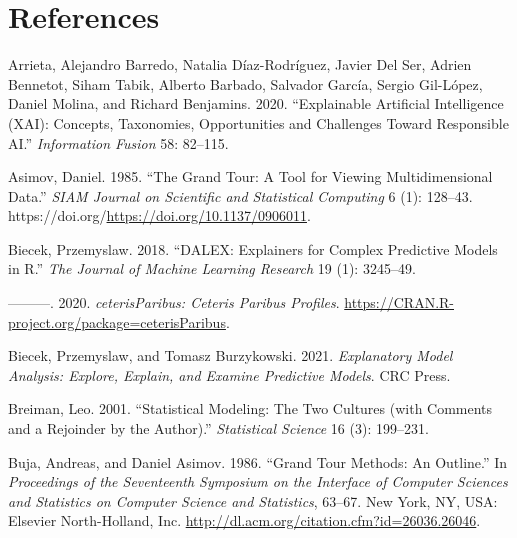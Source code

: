\documentclass[
]{article}
\newlength{\cslhangindent}
\newlength{\cslentryspacingunit} %
\newenvironment{CSLReferences}[2] %
 {%
  \setlength{\parindent}{0pt}
  \ifodd #1
  \let\oldpar\par
  \def\par{\hangindent=\cslhangindent\oldpar}
  \fi
  \setlength{\parskip}{#2\cslentryspacingunit}
 }%
 {}
\begin{document}
\hypertarget{references}{%
\section*{References}\label{references}}

\hypertarget{refs}{}
\begin{CSLReferences}{1}{0}
\leavevmode{}%
Arrieta, Alejandro Barredo, Natalia Díaz-Rodríguez, Javier Del Ser, Adrien Bennetot, Siham Tabik, Alberto Barbado, Salvador García, Sergio Gil-López, Daniel Molina, and Richard Benjamins. 2020. {``Explainable {Artificial} {Intelligence} ({XAI}): {Concepts}, Taxonomies, Opportunities and Challenges Toward Responsible {AI}.''} \emph{Information Fusion} 58: 82--115.

\leavevmode{}%
Asimov, Daniel. 1985. {``The {Grand} {Tour}: A {Tool} for {Viewing} {Multidimensional} {Data}.''} \emph{SIAM Journal on Scientific and Statistical Computing} 6 (1): 128--43. https://doi.org/\url{https://doi.org/10.1137/0906011}.

\leavevmode{}%
Biecek, Przemyslaw. 2018. {``{DALEX}: Explainers for Complex Predictive Models in {R}.''} \emph{The Journal of Machine Learning Research} 19 (1): 3245--49.

\leavevmode{}%
---------. 2020. \emph{{ceterisParibus}: {Ceteris} {Paribus} {Profiles}}. \url{https://CRAN.R-project.org/package=ceterisParibus}.

\leavevmode{}%
Biecek, Przemyslaw, and Tomasz Burzykowski. 2021. \emph{Explanatory {Model} {Analysis}: {Explore}, {Explain}, and {Examine} {Predictive} {Models}}. CRC Press.

\leavevmode{}%
Breiman, Leo. 2001. {``Statistical Modeling: {The} Two Cultures (with Comments and a Rejoinder by the Author).''} \emph{Statistical Science} 16 (3): 199--231.

\leavevmode{}%
Buja, Andreas, and Daniel Asimov. 1986. {``Grand {Tour} {Methods}: {An} {Outline}.''} In \emph{Proceedings of the {Seventeenth} {Symposium} on the {Interface} of {Computer} {Sciences} and {Statistics} on {Computer} {Science} and {Statistics}}, 63--67. New York, NY, USA: Elsevier North-Holland, Inc. \url{http://dl.acm.org/citation.cfm?id=26036.26046}.


\end{CSLReferences}
\end{document}

